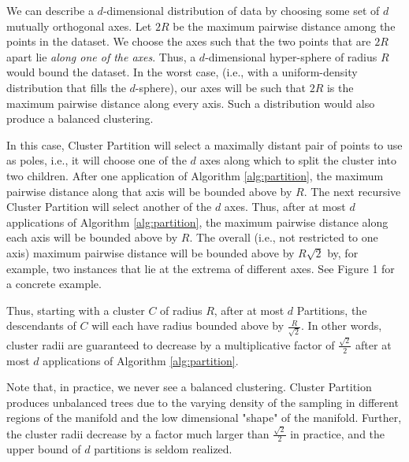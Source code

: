 We can describe a $d$-dimensional distribution of data by choosing some set of $d$ mutually orthogonal axes.
Let $2R$ be the maximum pairwise distance among the points in the dataset. 
We choose the axes such that the two points that are $2R$ apart lie \emph{along one of the axes}. 
Thus, a $d$-dimensional hyper-sphere of radius $R$ would bound the dataset. 
In the worst case, (i.e., with a uniform-density distribution that fills the $d$-sphere), our axes will be such that $2R$ is the maximum pairwise distance along every axis. 
Such a distribution would also produce a balanced clustering.


In this case, Cluster Partition will select a maximally distant pair of points to use as poles, i.e., it will choose one of the $d$ axes along
which to split the cluster into two children. 
After one application of Algorithm \ref{alg:partition}, the maximum pairwise distance along that axis will be
bounded above by $R$. 
The next recursive Cluster Partition will select another of the $d$ axes. 
Thus, after at most $d$ applications of Algorithm \ref{alg:partition}, the
maximum pairwise distance along each axis will be bounded above by $R$. 
The overall (i.e., not restricted to one axis) maximum pairwise distance 
will be bounded above by $R\sqrt{2}$ by, for example, two instances that lie at the extrema of different axes. 
See Figure 1 for a concrete example. 


Thus, starting with a cluster $C$ of radius $R$, after at most $d$ Partitions, the descendants of $C$ will each have radius
bounded above by $\frac{R}{\sqrt{2}}$. In other words, cluster radii are guaranteed to decrease by a multiplicative factor of $\frac{\sqrt{2}}{2}$ after at 
most $d$ applications of Algorithm \ref{alg:partition}. 


Note that, in practice, we never see a balanced clustering. Cluster Partition  produces unbalanced trees due to the varying density of the sampling 
in different regions of the manifold and the low dimensional "shape" of the manifold. Further, the cluster radii decrease by a factor much larger than 
$\frac{\sqrt{2}}{2}$ in practice, and the upper bound of $d$ partitions is seldom realized. 


